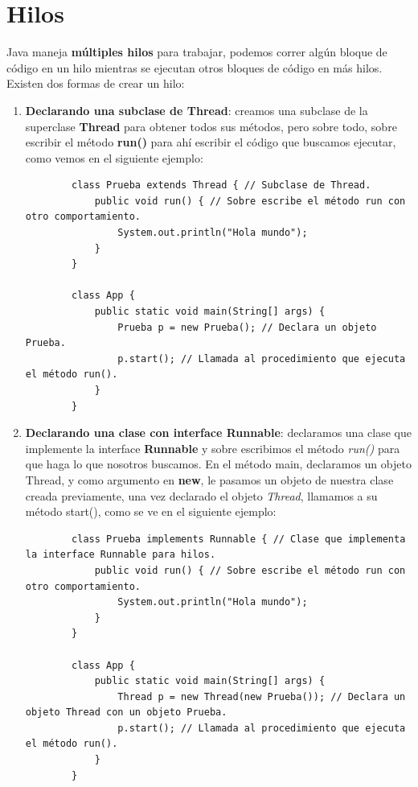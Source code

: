 \section{Hilos}
\hspace{0.55cm}Java maneja \textbf{múltiples hilos} para trabajar, podemos correr algún bloque de código en un hilo mientras se ejecutan otros bloques de código en más hilos. Existen dos formas de crear un hilo:
\begin{enumerate}
    \item \textbf{Declarando una subclase de Thread}: creamos una subclase de la superclase \textbf{Thread} para obtener todos sus métodos, pero sobre todo, sobre escribir el método \textbf{run()} para ahí escribir el código que buscamos ejecutar, como vemos en el siguiente ejemplo:
    \begin{lstlisting}
        class Prueba extends Thread { // Subclase de Thread.
            public void run() { // Sobre escribe el método run con otro comportamiento.
                System.out.println("Hola mundo");
            }
        }
        
        class App {
            public static void main(String[] args) {
                Prueba p = new Prueba(); // Declara un objeto Prueba.
                p.start(); // Llamada al procedimiento que ejecuta el método run().
            }
        }
    \end{lstlisting}
    \item \textbf{Declarando una clase con interface Runnable}: declaramos una clase que implemente la interface \textbf{Runnable} y sobre escribimos el método \textit{run()} para que haga lo que nosotros buscamos. En el método main, declaramos un objeto Thread, y como argumento en \textbf{new}, le pasamos un objeto de nuestra clase creada previamente, una vez declarado el objeto \textit{Thread}, llamamos a su método start(), como se ve en el siguiente ejemplo:
    \begin{lstlisting}
        class Prueba implements Runnable { // Clase que implementa la interface Runnable para hilos.
            public void run() { // Sobre escribe el método run con otro comportamiento.
                System.out.println("Hola mundo");
            }
        }
        
        class App {
            public static void main(String[] args) {
                Thread p = new Thread(new Prueba()); // Declara un objeto Thread con un objeto Prueba.
                p.start(); // Llamada al procedimiento que ejecuta el método run().
            }
        }
    \end{lstlisting}
\end{enumerate}

